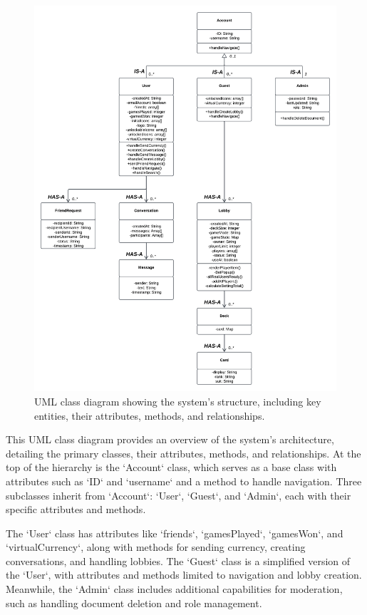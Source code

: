 \begin{figure}[htbp]
    \centering
    \includegraphics[width=1\linewidth]{CS482 Sequence Diagram Sprint 3.png}
    \caption{UML class diagram showing the system's structure, including key entities, their attributes, methods, and relationships.}
    \label{fig:umlclass}
\end{figure}

This UML class diagram provides an overview of the system’s architecture, detailing the primary classes, their attributes, methods, and relationships. At the top of the hierarchy is the `Account` class, which serves as a base class with attributes such as `ID` and `username` and a method to handle navigation. Three subclasses inherit from `Account`: `User`, `Guest`, and `Admin`, each with their specific attributes and methods. 

The `User` class has attributes like `friends`, `gamesPlayed`, `gamesWon`, and `virtualCurrency`, along with methods for sending currency, creating conversations, and handling lobbies. The `Guest` class is a simplified version of the `User`, with attributes and methods limited to navigation and lobby creation. Meanwhile, the `Admin` class includes additional capabilities for moderation, such as handling document deletion and role management.

